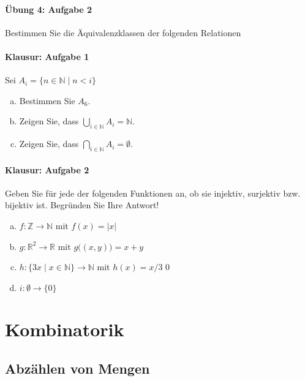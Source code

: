 \documentclass
[
  draft    = true,
  fontsize = 11pt,
  parskip  = half-,
  BCOR     = 0pt,
  DIV      = 11,
  ngerman,
  dvipsnames
]
{scrartcl}
\begin{document}
\paragraph{Übung 4: Aufgabe 2}
Bestimmen Sie die Äquivalenzklassen der folgenden Relationen

\paragraph{Klausur: Aufgabe 1}
Sei $A_i=\{n\in\mathbb{N}\mid n<i\}$
\begin{enumerate}[a)]
  \item Bestimmen Sie $A_6$.
  \item Zeigen Sie, dass $\bigcup_{i\in\mathbb{N}}A_i=\mathbb{N}$.
  \item Zeigen Sie, dass $\bigcap_{i\in\mathbb{N}}A_i=\emptyset$.
\end{enumerate}

\paragraph{Klausur: Aufgabe 2}
Geben Sie für jede der folgenden Funktionen an, ob sie injektiv, surjektiv bzw. bijektiv ist.
Begründen Sie Ihre Antwort!
\begin{enumerate}[a)]
  \item $f:\mathbb{Z}\to\mathbb{N}$ mit $f(x)=|x|$
  \item $g:\mathbb{R}^2\to\mathbb{R}$ mit $g\big((x,y)\big)=x+y$
  \item $h:\{3x\mid x\in\mathbb{N}\}\to\mathbb{N}$ mit $h(x)=x/3$
  0\item $i:\emptyset\to\{0\}$
\end{enumerate}

\section{Kombinatorik}

\subsection{Abzählen von Mengen}

\end{document}
